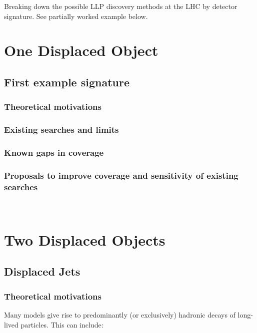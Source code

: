 Breaking down the possible LLP discovery methods at the LHC by detector signature. See partially worked example below.

\section{One Displaced Object}

\subsection{First example signature}
\subsubsection{Theoretical motivations}
\subsubsection{Existing searches and limits}
\subsubsection{Known gaps in coverage}
\subsubsection{Proposals to improve coverage and sensitivity of existing searches}
$\;$ \newline $\;$

\section{Two Displaced Objects}

\subsection{Displaced Jets}

\subsubsection{Theoretical motivations}

Many models give rise to predominantly (or exclusively) hadronic decays of long-lived particles. This can include:

